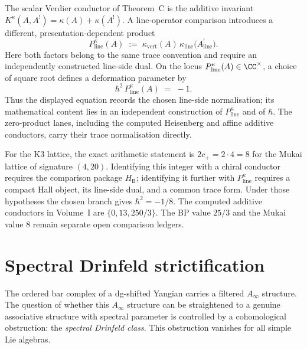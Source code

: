 \begin{remark}
\label{rem:oackd-3}
%
%
The scalar Verdier conductor of Theorem~C is the additive invariant
$K^\kappa(A,A^!)=\kappa(A)+\kappa(A^!)$.  A line-operator comparison
introduces a different, presentation-dependent product
\[
P^{\kappa}_{\mathrm{line}}(A)
\;:=\;
\kappa_{\mathrm{vert}}(A)\,
\kappa_{\mathrm{line}}\bigl(A^!_{\mathrm{line}}\bigr).
\]
Here both factors belong to the same trace convention and require an
independently constructed line-side dual.  On the locus
$P^{\kappa}_{\mathrm{line}}(A)\in\CC^\times$, a choice of square root
defines a deformation parameter by
\[
\hbar^{2}\,P^{\kappa}_{\mathrm{line}}(A)
\;=\;
-1.
\]
Thus the displayed equation records the chosen line-side
normalisation; its mathematical content lies in an independent
construction of $P^{\kappa}_{\mathrm{line}}$ and of $\hbar$.  The
zero-product lanes, including the computed Heisenberg and affine
additive conductors, carry their trace normalisation directly.

For the K3 lattice, the exact arithmetic statement is
$2c_+=2\cdot4=8$ for the Mukai lattice of signature $(4,20)$.
Identifying this integer with a chiral conductor requires the
comparison package $H_{\mathsf B}$; identifying it further with
$P^{\kappa}_{\mathrm{line}}$ requires a compact Hall object, its
line-side dual, and a common trace form.  Under those hypotheses the
chosen branch gives $\hbar^2=-1/8$.  The computed additive conductors
in Volume~I are $\{0,13,250/3\}$.  The BP value $25/3$ and the Mukai
value $8$ remain separate open comparison ledgers.
\end{remark}



\section{Spectral Drinfeld strictification}
\label{sec:spectral-drinfeld-strictification}

The ordered bar complex of a dg-shifted Yangian carries a filtered
$A_\infty$ structure. The question of whether this $A_\infty$ structure
can be straightened to a genuine associative structure with spectral
parameter is controlled by a cohomological obstruction: the
\emph{spectral Drinfeld class}. This
obstruction vanishes for all simple Lie algebras.

